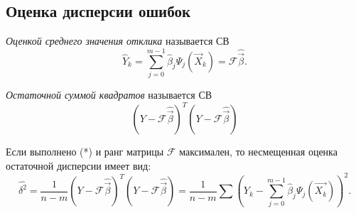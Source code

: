\subsection{Оценка дисперсии ошибок}

\begin{definition}
  \emph{Оценкой среднего значения отклика} называется СВ
  \[
    \hat{Y}_k = \sum_{j=0}^{m-1} \hat{\beta}_j \Psi_j(\vec{X}_k) = \mathcal{F} \hat{\vec{\beta}}. 
  \]
\end{definition}

\begin{definition}
  \emph{Остаточной суммой квадратов} называется СВ
  \[
    (Y - \mathcal{F} \hat{\vec{\beta}})^T (Y-\mathcal{F}\hat{\vec{\beta}})
  \]
\end{definition}

\begin{theorem}
  Если выполнено (*) и ранг матрицы $\mathcal{F}$ максимален, то несмещенная оценка остаточной
  дисперсии имеет вид:
  \[
    \hat{\delta^2}
    = \frac{1}{n-m} (Y-\mathcal{F}\hat{\vec{\beta}})^T (Y-\mathcal{F}\hat{\vec{\beta}})
    = \dfrac{1}{n-m} \sum \left(Y_k - \sum_{j=0}^{m-1} \hat{\beta}_j \Psi_j (\vec{X_k}) \right)^2.
  \]
\end{theorem}

